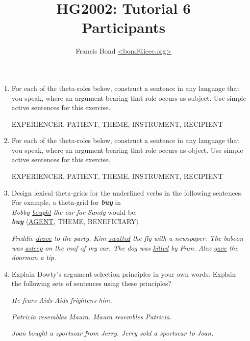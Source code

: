 \documentclass[a4paper]{article}
\title{\vspace*{-30mm}HG2002: Tutorial 6\\  Participants}
\author{Francis Bond \url{<bond@ieee.org>}}
\date{}%
\newcommand{\lex}[1]{\textbf{\textit{#1}}}
\newcommand{\ix}{\ex\it}
\newcommand{\ul}[1]{\uline{#1}}
\begin{document}
\maketitle

\begin{enumerate}


\item For each of the theta-roles below, construct a sentence in any
  language that you speak, where an argument bearing that role occurs
  as subject. Use simple active sentences for this exercise.

EXPERIENCER, PATIENT, THEME, INSTRUMENT, RECIPIENT

\item For each of the theta-roles below, construct a sentence in any
  language that you speak, where an argument bearing that role occurs
  as object. Use simple active sentences for this exercise.

EXPERIENCER, PATIENT, THEME, INSTRUMENT, RECIPIENT



\item Design lexical theta-grids for the underlined verbs in the
  following sentences. For example, a theta-grid for \lex{buy} in
  \\ \textit{Bobby \ul{bought} the car for Sandy} would be: 
  \\ \lex{buy} $\langle$\ul{AGENT}, THEME, BENEFICIARY$\rangle$

  \begin{exe}
    \ix Freddie \ul{drove} to the party.
    \ix Kim \ul{swatted} the fly with a newspaper.
    \ix The baboon was \ul{asleep} on the roof of my car.
    \ix The dog was \ul{killed} by Fran.
    \ix Alex \ul{gave} the doorman a tip.
  \end{exe}
  

\item Explain Dowty's argument selection principles in your own
  words. Explain the following sets of sentences using these principles?

\begin{exe}
    \ex
    \begin{xlist}
      \ix He fears Aids
      \ix Aids frightens him.
    \end{xlist}
    \ex
    \begin{xlist}
      \ix Patricia resembles Maura.
      \ix Maura resembles Patricia.
    \end{xlist}
    \ex
    \begin{xlist}
      \ix Joan bought a sportscar from Jerry.
      \ix Jerry sold a sportscar to Joan. 
    \end{xlist}
  \end{exe}


\end{enumerate}
\end{document}
